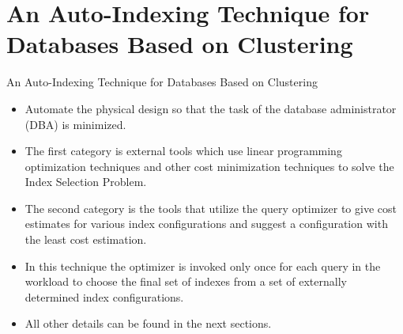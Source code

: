 \documentclass[Serif, 10pt, brown]{beamer}
\theoremstyle{example}
\theoremstyle{plain}
\begin{document}
\section{An Auto-Indexing Technique for Databases Based on Clustering}

\begin{frame}{An Auto-Indexing Technique for Databases Based on Clustering}
	\begin{itemize}
		\item Automate the physical design so that the task of the database administrator (DBA) is minimized.
		\item The first category is external tools which use linear programming optimization techniques and other cost minimization techniques to solve the Index Selection Problem.
		\item The second category is the tools that utilize the query optimizer to give cost estimates for various index
		configurations and suggest a configuration with the least cost estimation.
		\item In this technique the optimizer is invoked only once for each query in the workload to choose the final set of indexes from a set of externally determined index configurations.
		\item All other details can be found in the next sections.
	\end{itemize}
\end{frame}

		
\end{document}
